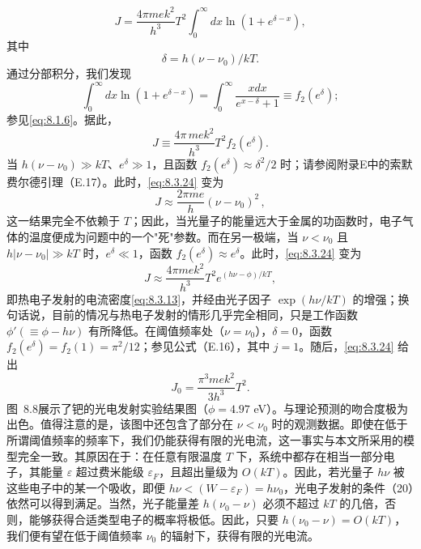 \begin{equation}\tag{8.3.21}\label{eq:8.3.21}
J = \frac { 4 \pi m e k ^{2} } { h ^{3} } T ^{2} \int _ { 0 } ^{\infty} d x \ln ( 1 + e ^{\delta - x} ) ,
\end{equation}
其中
\begin{equation}\tag{8.3.22}\label{eq:8.3.22}
\delta = h ( \nu - \nu _ { 0 } ) / k T .
\end{equation}
通过分部积分，我们发现
\begin{equation}\tag{8.3.23}\label{eq:8.3.23}
\int _ { 0 } ^{\infty} d x \ln ( 1 + e ^{\delta - x} ) = \int _ { 0 } ^{\infty} \frac { x d x } { e ^{x - \delta} + 1 } \equiv f _ { 2 } ( e ^{\delta} ) ;
\end{equation}
参见\autoref{eq:8.1.6}。据此，
\begin{equation}\tag{8.3.24}\label{eq:8.3.24}
J \equiv \frac { 4 \pi \, m e k ^{2} } { h ^{3} } T ^{2} f _ { 2 } ( e ^{\delta} ) .
\end{equation}
当 \(h(\nu - \nu_0) \gg kT\)、\(e^\delta \gg 1\)，且函数 \(f_2(e^\delta) \approx \delta^2/2\) 时；请参阅附录E中的索默费尔德引理（E.17）。此时，\autoref{eq:8.3.24} 变为
\begin{equation}\tag{8.3.25}\label{eq:8.3.25}
J \approx \frac { 2 \pi m e } { h } ( \nu - \nu _ { 0 } ) ^{2} \, ,
\end{equation}
这一结果完全不依赖于 \(T\)；因此，当光量子的能量远大于金属的功函数时，电子气体的温度便成为问题中的一个"死"参数。而在另一极端，当 \(\nu < \nu_0\) 且 \(h|\nu - \nu_0| \gg kT\) 时，\(e^\delta \ll 1\)，函数 \(f_2(e^\delta) \approx e^\delta\)。此时，\autoref{eq:8.3.24} 变为
\begin{equation}\tag{8.3.26}\label{eq:8.3.26}
J \approx \frac { 4 \pi m e k ^{2} } { h ^{3} } T ^{2} e ^{( h \nu - \phi ) / k T} ,
\end{equation}
即热电子发射的电流密度\autoref{eq:8.3.13}，并经由光子因子 \(\exp(h\nu/kT)\) 的增强；换句话说，目前的情况与热电子发射的情形几乎完全相同，只是工作函数 \(\phi'(\equiv\phi-h\nu)\) 有所降低。在阈值频率处（\(\nu=\nu_0\)），\(\delta=0\)，函数 \(f_2(e^\delta)=f_2(1)=\pi^2/12\)；参见公式（E.16），其中 \(j=1\)。随后，\autoref{eq:8.3.24} 给出
\begin{equation}\tag{8.3.27}\label{eq:8.3.27}
J _ { 0 } = \frac { \pi ^{3} m e k ^{2} } { 3 h ^{3} } T ^{2} .
\end{equation}
图~8.8展示了钯的光电发射实验结果图（\(\phi = 4.97\) eV）。与理论预测的吻合度极为出色。值得注意的是，该图中还包含了部分在 \(\nu < \nu_0\) 时的观测数据。即使在低于所谓阈值频率的频率下，我们仍能获得有限的光电流，这一事实与本文所采用的模型完全一致。其原因在于：在任意有限温度 \(T\) 下，系统中都存在相当一部分电子，其能量 \(\varepsilon\) 超过费米能级 \(\varepsilon_F\)，且超出量级为 \(O(kT)\)。因此，若光量子 \(h\nu\) 被这些电子中的某一个吸收，即便 \(h\nu < (W - \varepsilon_F) = h\nu_0\)，光电子发射的条件（20）依然可以得到满足。当然，光子能量差 \(h(\nu_0 - \nu)\) 必须不超过 \(kT\) 的几倍，否则，能够获得合适类型电子的概率将极低。因此，只要 \(h(\nu_0 - \nu) = O(kT)\)，我们便有望在低于阈值频率 \(\nu_0\) 的辐射下，获得有限的光电流。
